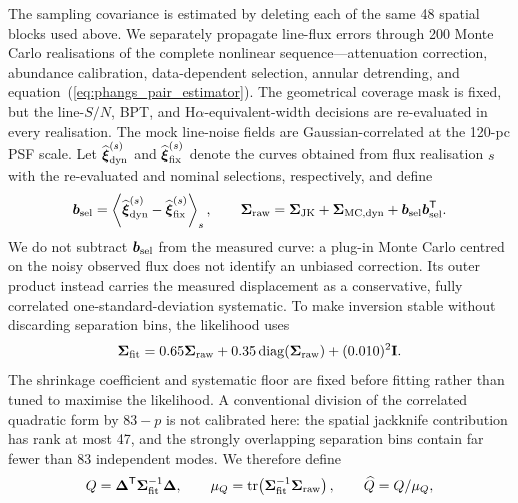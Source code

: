 \documentclass[fleqn,usenatbib]{mnras}
\newcommand{\bs}[1]{\boldsymbol{#1}}
\begin{document}
The sampling covariance is estimated by deleting each of the same 48 spatial blocks used above.  We separately propagate line-flux errors through 200 Monte Carlo realisations of the complete nonlinear sequence---attenuation correction, abundance calibration, data-dependent selection, annular detrending, and equation~(\ref{eq:phangs_pair_estimator}).  The geometrical coverage mask is fixed, but the line-$S/N$, BPT, and H$\alpha$-equivalent-width decisions are re-evaluated in every realisation.  The mock line-noise fields are Gaussian-correlated at the 120-pc PSF scale.  Let $\widehat{\boldsymbol\xi}^{(s)}_{\rm dyn}$ and $\widehat{\boldsymbol\xi}^{(s)}_{\rm fix}$ denote the curves obtained from flux realisation $s$ with the re-evaluated and nominal selections, respectively, and define
\begin{equation}
    \bs{b}_{\rm sel}=\left\langle
    \widehat{\boldsymbol\xi}_{\rm dyn}^{(s)}
    -\widehat{\boldsymbol\xi}_{\rm fix}^{(s)}
    \right\rangle_s,
    \qquad
    \boldsymbol\Sigma_{\rm raw}=
    \boldsymbol\Sigma_{\rm JK}
    +\boldsymbol\Sigma_{\rm MC,dyn}
    +\bs{b}_{\rm sel}\bs{b}_{\rm sel}^{\mathsf T}.
    \label{eq:phangs_selection_covariance}
\end{equation}
We do not subtract $\bs{b}_{\rm sel}$ from the measured curve: a plug-in Monte Carlo centred on the noisy observed flux does not identify an unbiased correction.  Its outer product instead carries the measured displacement as a conservative, fully correlated one-standard-deviation systematic.  To make inversion stable without discarding separation bins, the likelihood uses
\begin{equation}
    \boldsymbol\Sigma_{\rm fit}
    =0.65\boldsymbol\Sigma_{\rm raw}
    +0.35\operatorname{diag}(\boldsymbol\Sigma_{\rm raw})
    +(0.010)^2\mathbf I.
    \label{eq:phangs_fit_covariance}
\end{equation}
The shrinkage coefficient and systematic floor are fixed before fitting rather than tuned to maximise the likelihood.  A conventional division of the correlated quadratic form by $83-p$ is not calibrated here: the spatial jackknife contribution has rank at most 47, and the strongly overlapping separation bins contain far fewer than 83 independent modes.  We therefore define
\begin{equation}
    Q=\boldsymbol\Delta^{\mathsf T}
    \boldsymbol\Sigma_{\rm fit}^{-1}\boldsymbol\Delta,
    \qquad
    \mu_Q=\operatorname{tr}\!\left(
    \boldsymbol\Sigma_{\rm fit}^{-1}\boldsymbol\Sigma_{\rm raw}
    \right),
    \qquad
    \widehat Q=Q/\mu_Q,
    \label{eq:phangs_calibrated_discrepancy}
\end{equation}
\end{document}
